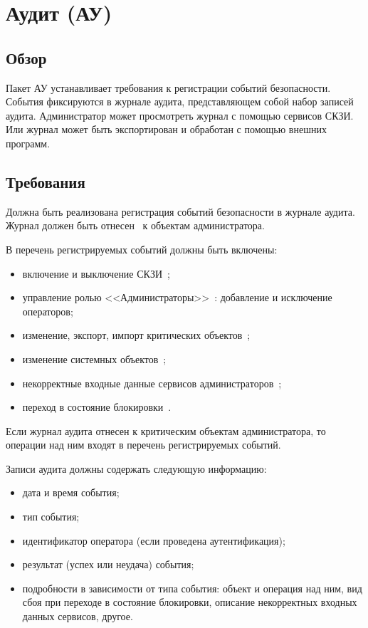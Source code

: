 \section{Аудит (АУ)}\label{AU}

\subsection{Обзор}\label{AU.Defs}

Пакет АУ устанавливает требования к регистрации событий безопасности.
События фиксируются в журнале аудита, представляющем собой набор 
записей аудита.
%
Администратор может просмотреть журнал с помощью сервисов СКЗИ.
Или журнал может быть экспортирован и обработан с помощью внешних программ.

\subsection{Требования}\label{AU.Reqs}


\label{R.AU.Log} %
Должна быть реализована регистрация событий безопасности в журнале аудита. 
Журнал должен быть отнесен~ к объектам администратора.

\label{R.AU.Events} %
В перечень регистрируемых событий должны быть включены:
\begin{itemize} 
\item
включение и выключение СКЗИ~;
\item
управление ролью <<Администраторы>>~: 
добавление и исключение операторов; 
\item
изменение, экспорт, импорт критических объектов~; 
\item
изменение системных объектов~; 
\item
некорректные входные данные сервисов администраторов~;
\item
переход в состояние блокировки~.
\end{itemize}

\begin{note}
Если журнал аудита отнесен к критическим объектам администратора,
то операции над ним входят в перечень регистрируемых событий.
\end{note}

\label{R.AU.Records} %
Записи аудита должны содержать следующую информацию:
\begin{itemize} 
\item
дата и время события;
\item
тип события; 
\item
идентификатор оператора (если проведена аутентификация); 
\item
результат (успех или неудача) события; 
\item
подробности в зависимости от типа события:
объект и операция над ним,
вид сбоя при переходе в состояние блокировки,
описание некорректных входных данных сервисов,
другое.
\end{itemize}

